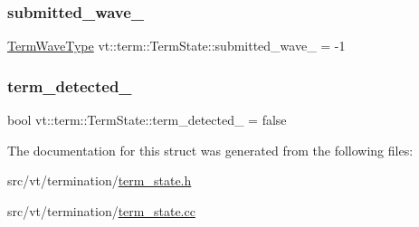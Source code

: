 \subsubsection{\texorpdfstring{submitted\+\_\+wave\+\_\+}{submitted\_wave\_}}
{\footnotesize\ttfamily \hyperlink{namespacevt_1_1term_a4af17606966b2b5a6cba523bc39095a3}{Term\+Wave\+Type} vt\+::term\+::\+Term\+State\+::submitted\+\_\+wave\+\_\+ = -\/1\hspace{0.3cm}{\ttfamily [private]}}

\mbox{\label{structvt_1_1term_1_1_term_state_a89d2e8ee209a8c6ad2ae2476373aebe8}} 
\subsubsection{\texorpdfstring{term\+\_\+detected\+\_\+}{term\_detected\_}}
{\footnotesize\ttfamily bool vt\+::term\+::\+Term\+State\+::term\+\_\+detected\+\_\+ = false\hspace{0.3cm}{\ttfamily [private]}}



The documentation for this struct was generated from the following files\+:\begin{DoxyCompactItemize}
\item 
src/vt/termination/\hyperlink{term__state_8h}{term\+\_\+state.\+h}\item 
src/vt/termination/\hyperlink{term__state_8cc}{term\+\_\+state.\+cc}\end{DoxyCompactItemize}
